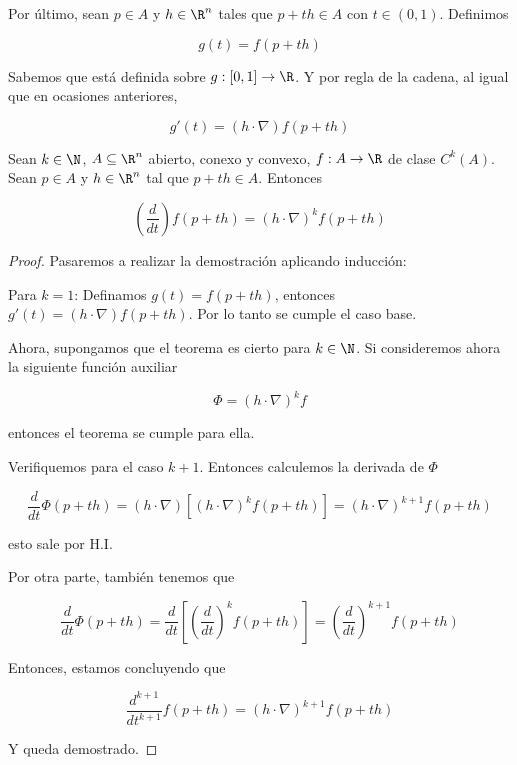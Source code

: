 \begin{nota}
    Por último, sean $p \in A$ y $h \in \R^n$ tales que $p + th \in A$ con $t \in (0,1)$. Definimos
    
    \[
    g(t) = f(p + th)
    \]
    
    Sabemos que está definida sobre $g: [0,1] \rightarrow \R$. Y por regla de la cadena, al igual que en ocasiones anteriores,
    
    \[
    g'(t) = (h \cdot \nabla) f(p + th)
    \]
\end{nota}

\begin{pro}
    Sean $k \in \N$, $A \subseteq \R^n$ abierto, conexo y convexo, $f: A \rightarrow \R$ de clase $C^k(A)$. Sean $p \in A$ y $h \in \R^n$ tal que $p + th \in A$. Entonces
    
    \[
    \left( \dfrac{d}{dt} \right) f(p+th) = \left( h \cdot \nabla \right)^k f(p+th)
    \]
\end{pro}

\begin{proof}
    Pasaremos a realizar la demostración aplicando inducción:
    
    Para $k = 1$: Definamos $g(t) = f(p+th)$, entonces $g'(t) = (h \cdot \nabla) f(p+th)$. Por lo tanto se cumple el caso base.
    
    Ahora, supongamos que el teorema es cierto para $k \in \N$. Si consideremos ahora la siguiente función auxiliar
    
    \[
    \Phi = (h \cdot \nabla)^k f
    \]
    
    \noindent entonces el teorema se cumple para ella.
    
    Verifiquemos para el caso $k+1$. Entonces calculemos la derivada de $\Phi$
    
    \[
    \dfrac{d}{dt} \Phi(p+th) = \left(h \cdot \nabla\right) \left[ \left(h \cdot \nabla\right)^k f(p+th) \right] = \left(h \cdot \nabla\right)^{k+1}f(p+th)
    \]
    
    \noindent esto sale por H.I.
    
    Por otra parte, también tenemos que
    
    \[
    \dfrac{d}{dt} \Phi(p+th) = \dfrac{d}{dt} \left[ \left( \dfrac{d}{dt} \right)^k f(p+th) \right] = \left( \frac{d}{dt} \right)^{k+1} f(p+th)
    \]
    
    Entonces, estamos concluyendo que
    
    \[
    \dfrac{d^{k+1}}{dt^{k+1}}f(p+th) = (h \cdot \nabla)^{k+1}f(p+th)
    \]
    
    Y queda demostrado.
\end{proof}

